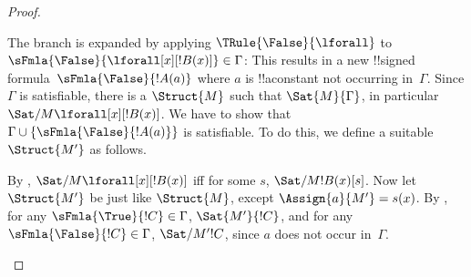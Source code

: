 \documentclass[../../../include/open-logic-section]{subfiles}
\begin{document}
\begin{proof}
\begin{enumerate}
{\item The branch is expanded by applying $\TRule{\False}{\lforall}$ to
  $\sFmla{\False}{\lforall[x][!B(x)]} \in \Gamma$: This results in a
  new !!{signed formula}~$\sFmla{\False}{!A(a)}$ where $a$ is
  !!a{constant} not occurring in~$\Gamma$. Since $\Gamma$ is
  satisfiable, there is a $\Struct{M}$ such that $\Sat{M}{\Gamma}$, in
  particular $\Sat/{M}{\lforall[x][!B(x)]}$. We have to show that
  $\Gamma \cup \{\sFmla{\False}{!A(a)}\}$ is satisfiable. To do this,
  we define a suitable~$\Struct{M'}$ as follows.

  By , $\Sat/{M}{\lforall[x][!B(x)]}$
  iff for some $s$, $\Sat/{M}{!B(x)}[s]$. Now let $\Struct{M'}$ be
  just like $\Struct{M}$, except $\Assign{a}{M'} = s(x)$.  By
  , for any
  $\sFmla{\True}{!C} \in \Gamma$, $\Sat{M'}{!C}$, and for any
  $\sFmla{\False}{!C} \in \Gamma$, $\Sat/{M'}{!C}$, since $a$ does not
  occur in~$\Gamma$.

}
\end{enumerate}
\end{proof}
\end{document}
